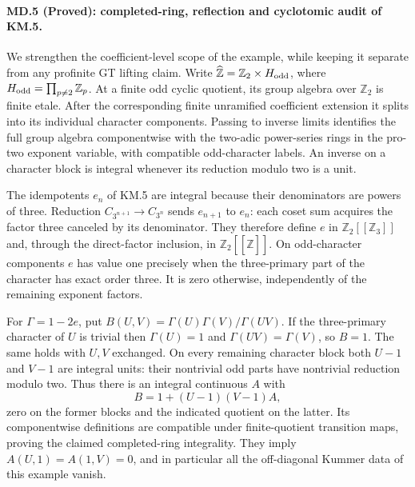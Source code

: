 \paragraph{MD.5 (Proved): completed-ring, reflection and cyclotomic audit of KM.5.}
We strengthen the coefficient-level scope of the example, while
keeping it separate from any profinite GT lifting claim.
Write $\widehat{\mathbb Z}=\mathbb Z_2\times H_{\rm odd}$,
where $H_{\rm odd}=\prod_{p\ne2}\mathbb Z_p$.
At a finite odd cyclic quotient, its group algebra over
$\mathbb Z_2$ is finite etale. After the corresponding finite
unramified coefficient extension it splits into its individual
character components. Passing to inverse limits identifies
the full group algebra componentwise with the two-adic
power-series rings in the pro-two exponent variable, with
compatible odd-character labels. An inverse on a character block
is integral whenever its reduction modulo two is a unit.

The idempotents $e_n$ of KM.5 are integral because their
denominators are powers of three. Reduction
$C_{3^{n+1}}\to C_{3^n}$ sends $e_{n+1}$ to $e_n$:
each coset sum acquires the factor three canceled by its
denominator. They therefore define $e$ in
$\mathbb Z_2[[\mathbb Z_3]]$ and, through the direct-factor
inclusion, in $\mathbb Z_2[[\widehat{\mathbb Z}]]$.
On odd-character components $e$ has value one precisely when
the three-primary part of the character has exact order three.
It is zero otherwise, independently of the remaining exponent factors.

For $\Gamma=1-2e$, put
$B(U,V)=\Gamma(U)\Gamma(V)/\Gamma(UV)$.
If the three-primary character of $U$ is trivial then
$\Gamma(U)=1$ and $\Gamma(UV)=\Gamma(V)$, so $B=1$.
The same holds with $U,V$ exchanged. On every remaining
character block both $U-1$ and $V-1$ are integral units:
their nontrivial odd parts have nontrivial reduction modulo two.
Thus there is an integral continuous $A$ with
\[
 B=1+(U-1)(V-1)A,
\]
zero on the former blocks and the indicated quotient on the latter.
Its componentwise definitions are compatible under finite-quotient
transition maps, proving the claimed completed-ring integrality.
They imply $A(U,1)=A(1,V)=0$, and in particular all the
off-diagonal Kummer data of this example vanish.

